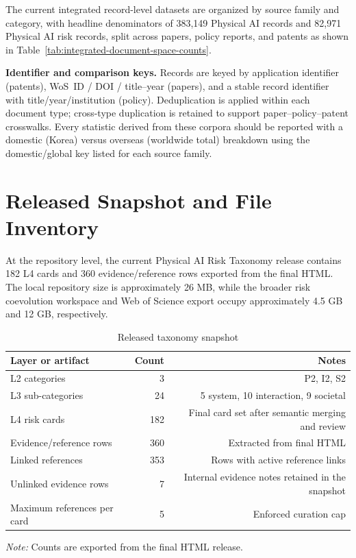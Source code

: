 \documentclass[11pt]{article}
\begin{document}
The current integrated record-level datasets are organized by source family and category, with headline denominators of 383,149 Physical AI records and 82,971 Physical AI risk records, split across papers, policy reports, and patents as shown in Table~\ref{tab:integrated-document-space-counts}.

\textbf{Identifier and comparison keys.} Records are keyed by application identifier (patents), WoS~ID / DOI / title--year (papers), and a stable record identifier with title/year/institution (policy). Deduplication is applied within each document type; cross-type duplication is retained to support paper--policy--patent crosswalks. Every statistic derived from these corpora should be reported with a domestic (Korea) versus overseas (worldwide total) breakdown using the domestic/global key listed for each source family.

\section{Released Snapshot and File Inventory}

At the repository level, the current Physical AI Risk Taxonomy release contains 182 L4 cards and 360 evidence/reference rows exported from the final HTML. The local repository size is approximately 26 MB, while the broader risk coevolution workspace and Web of Science export occupy approximately 4.5 GB and 12 GB, respectively.

\begin{table}[htbp]
\centering
\footnotesize
\caption{Released taxonomy snapshot}
\label{tab:taxonomy-snapshot}
\begin{tabular}{lrr}
\toprule
Layer or artifact & Count & Notes \\
\midrule
L2 categories & 3 & P2, I2, S2 \\
L3 sub-categories & 24 & 5 system, 10 interaction, 9 societal \\
L4 risk cards & 182 & Final card set after semantic merging and review \\
Evidence/reference rows & 360 & Extracted from final HTML \\
Linked references & 353 & Rows with active reference links \\
Unlinked evidence rows & 7 & Internal evidence notes retained in the snapshot \\
Maximum references per card & 5 & Enforced curation cap \\
\bottomrule
\end{tabular}
\par\smallskip\begin{minipage}{0.92\linewidth}
\footnotesize\textit{Note:} Counts are exported from the final HTML release.
\end{minipage}
\end{table}
\end{document}
